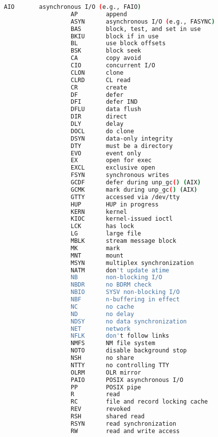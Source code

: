 {{\begin{lstlisting}[language=bash]
                   AIO       asynchronous I/O (e.g., FAIO)
                   AP        append
                   ASYN      asynchronous I/O (e.g., FASYNC)
                   BAS       block, test, and set in use
                   BKIU      block if in use
                   BL        use block offsets
                   BSK       block seek
                   CA        copy avoid
                   CIO       concurrent I/O
                   CLON      clone
                   CLRD      CL read
                   CR        create
                   DF        defer
                   DFI       defer IND
                   DFLU      data flush
                   DIR       direct
                   DLY       delay
                   DOCL      do clone
                   DSYN      data-only integrity
                   DTY       must be a directory
                   EVO       event only
                   EX        open for exec
                   EXCL      exclusive open
                   FSYN      synchronous writes
                   GCDF      defer during unp_gc() (AIX)
                   GCMK      mark during unp_gc() (AIX)
                   GTTY      accessed via /dev/tty
                   HUP       HUP in progress
                   KERN      kernel
                   KIOC      kernel-issued ioctl
                   LCK       has lock
                   LG        large file
                   MBLK      stream message block
                   MK        mark
                   MNT       mount
                   MSYN      multiplex synchronization
                   NATM      don't update atime
                   NB        non-blocking I/O
                   NBDR      no BDRM check
                   NBIO      SYSV non-blocking I/O
                   NBF       n-buffering in effect
                   NC        no cache
                   ND        no delay
                   NDSY      no data synchronization
                   NET       network
                   NFLK      don't follow links
                   NMFS      NM file system
                   NOTO      disable background stop
                   NSH       no share
                   NTTY      no controlling TTY
                   OLRM      OLR mirror
                   PAIO      POSIX asynchronous I/O
                   PP        POSIX pipe
                   R         read
                   RC        file and record locking cache
                   REV       revoked
                   RSH       shared read
                   RSYN      read synchronization
                   RW        read and write access

\end{lstlisting}}}
